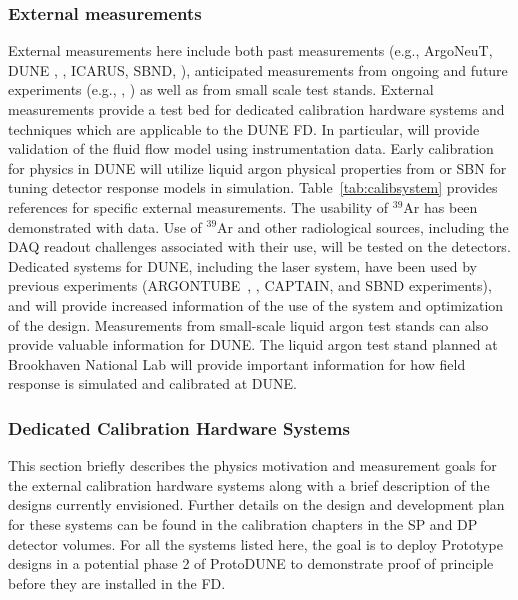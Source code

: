 \subsubsection{External measurements} 
External measurements here include both past measurements (e.g., ArgoNeuT, DUNE , , ICARUS, SBND, \lariat), anticipated measurements from ongoing and future experiments (e.g., , ) as well as from small scale  test stands. External measurements provide a test bed for dedicated calibration hardware systems and techniques which are applicable to the DUNE FD. In particular,  will provide validation of the fluid flow model using instrumentation data. Early calibration for physics in DUNE will utilize liquid argon physical properties from  or SBN  for tuning detector response models in simulation. Table~\ref{tab:calibsystem} provides  references for specific external measurements. The usability of ${}^{39}$Ar has been demonstrated with \microboone data. 
Use of  ${}^{39}$Ar  and other radiological sources, including the DAQ readout challenges associated with their use, will be tested on the  detectors. Dedicated systems for DUNE, including the laser system, have been used by previous experiments (ARGONTUBE~\cite{Zeller:2013sva}, , CAPTAIN, and SBND experiments), and will provide increased information of the use of the system and optimization of the design. Measurements from small-scale liquid argon test stands can also provide valuable information for DUNE. The liquid argon test stand planned at Brookhaven National Lab will provide important information for how field response is simulated and calibrated at DUNE.

\subsubsection{Dedicated Calibration Hardware Systems}
\label{sec:phys-calib-hardware}
This section briefly describes the physics motivation and measurement goals for the external calibration hardware systems along with a brief description of the designs currently envisioned. Further details on the design and development plan for these systems can be found in the calibration chapters  in the SP and DP detector volumes. For all the systems listed here, the goal is to deploy Prototype designs in a potential phase 2 of ProtoDUNE to demonstrate proof of principle before they are installed in the FD.

